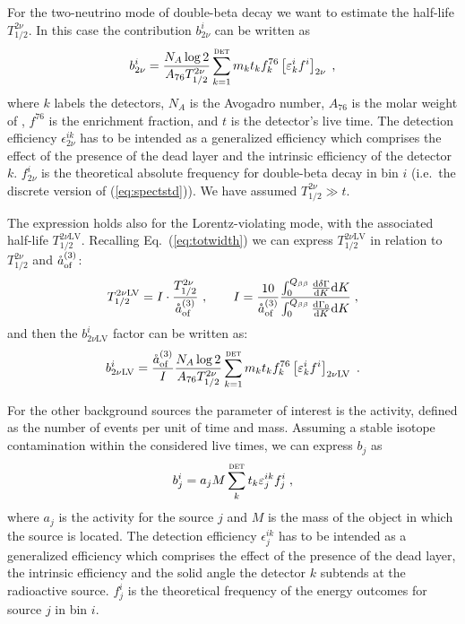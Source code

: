 \marginnote{$2\nbb$} For the two-neutrino mode of double-beta decay we want to estimate the half-life $T_{1/2}^{2\nu}$. In this case the contribution $b_{2\nu}^i$ can be written as
\begin{equation}b_{2\nu}^i=\frac{N_A\log2}{A_{76}T_{1/2}^{2\nu}}\sum_{k=1}^\textsc{det}m_kt_kf^{76}_k\left[\epsilon^i_kf^i\right]_{2\nu}\;,\end{equation}
	where $k$ labels the detectors, $N_A$ is the Avogadro number, $A_{76}$ is the molar weight of , $f^{76}$ is the enrichment fraction, and $t$ is the detector's live time. The detection efficiency $\epsilon_{2\nu}^{ik}$ has to be intended as a generalized efficiency which comprises the effect of the presence of the dead layer and the intrinsic efficiency of the detector $k$. $f_{2\nu}^i$ is the theoretical absolute frequency for double-beta decay in bin $i$ (i.e.~the discrete version of (\ref{eq:spectstd})). We have assumed $T_{1/2}^{2\nu}\gg t$.

	The expression holds also for the Lorentz-violating mode, with the associated half-life $T_{1/2}^{2\nu\text{LV}}$. Recalling Eq.~(\ref{eq:totwidth}) we can express $T_{1/2}^{2\nu\text{LV}}$ in relation to $T_{1/2}^{2\nu}$ and $\aof$:
\begin{equation}T_{1/2}^{2\nu\text{LV}}=I\cdot\frac{T_{1/2}^{2\nu}}{\aof}\ ,\qquad I=\frac{10}{\aof}\frac{\int_0^{Q_{\beta\beta}}\frac{\text{d}\delta\Gamma}{\text{d}K}\text{d}K}{\int_0^{Q_{\beta\beta}}\frac{\text{d}\Gamma_0}{\text{d}K}\text{d}K}\;,\end{equation}
and then the $b_{2\nu\text{LV}}^i$ factor can be written as:
\begin{equation}b_{2\nu\text{LV}}^i=\frac{\aof}{I}\frac{N_A\log2}{A_{76}T_{1/2}^{2\nu}}\sum_{k=1}^\textsc{det}m_kt_kf^{76}_k\left[\epsilon^i_kf^i\right]_{2\nu\text{LV}}\ .\end{equation}

 For the other background sources the parameter of interest is the activity, defined as the number of events per unit of time and mass. Assuming a stable isotope contamination within the considered live times, we can express $b_j$ as
\begin{equation}b_j^i=a_jM\sum_k^\textsc{det}t_k\epsilon_j^{ik}f_j^i\;,\label{eq:extsources}\end{equation}
where $a_j$ is the activity for the source $j$ and $M$ is the mass of the object in which the source is located. The detection efficiency $\epsilon_j^{ik}$ has to be intended as a generalized efficiency which comprises the effect of the presence of the dead layer, the intrinsic efficiency and the solid angle the detector $k$ subtends at the radioactive source. $f_j^i$ is the theoretical frequency of the energy outcomes for source $j$ in bin $i$.

